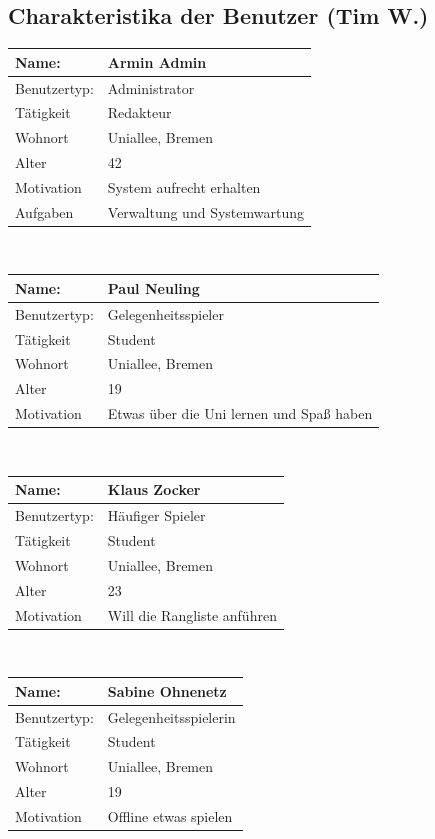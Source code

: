 \documentclass[fontsize=12pt,paper=a4,twoside]{scrartcl}
\begin{document}
\subsection{Charakteristika der Benutzer (Tim W.)}
	\begin{tabular}{|p{}|p{}|}\hline
       \textbf{Name:} &  \textbf{Armin Admin}\\\hline
       Benutzertyp: & Administrator\\\hline
       Tätigkeit	& Redakteur\\\hline
       Wohnort & Uniallee, Bremen\\\hline
       Alter	 & 42\\\hline
       Motivation & System aufrecht erhalten\\\hline
       Aufgaben & Verwaltung und Systemwartung\\\hline
    \end{tabular}\\
        
    	\begin{tabular}{|p{}|p{}|}\hline
        \textbf{Name:} &  \textbf{Paul Neuling}\\\hline
       Benutzertyp: & Gelegenheitsspieler \\\hline
       Tätigkeit	& Student\\\hline
       Wohnort & Uniallee, Bremen\\\hline
       Alter	 & 19\\\hline
       Motivation & Etwas über die Uni lernen und Spaß haben\\\hline
    \end{tabular}\\
    
    	\begin{tabular}{|p{}|p{}|}\hline
        \textbf{Name:} &  \textbf{Klaus Zocker}\\\hline
       Benutzertyp: & Häufiger Spieler \\\hline
       Tätigkeit	& Student\\\hline
       Wohnort & Uniallee, Bremen\\\hline
       Alter	 & 23\\\hline
       Motivation & Will die Rangliste anführen\\\hline
    \end{tabular}\\
    
    \begin{tabular}{|p{}|p{}|}\hline
        \textbf{Name:} &  \textbf{Sabine Ohnenetz}\\\hline
       Benutzertyp: & Gelegenheitsspielerin \\\hline
       Tätigkeit	& Student\\\hline
       Wohnort & Uniallee, Bremen\\\hline
       Alter	 & 19\\\hline
       Motivation & Offline etwas spielen \\\hline
    \end{tabular}\\
    
\end{document}
